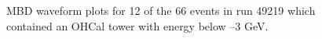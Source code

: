 \begin{figure}[h!]
    \caption{MBD waveform plots for 12 of the 66 events in run 49219 which contained an OHCal tower with energy below --3 GeV.}
\label{fig:MBD_2D_waveforms}
\end{figure}


